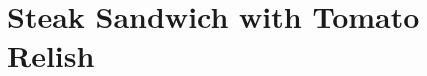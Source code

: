 \thispagestyle{fancy}
\section{Steak Sandwich with Tomato Relish}
\AddToShipoutPicture*{\SteakSandwhich}